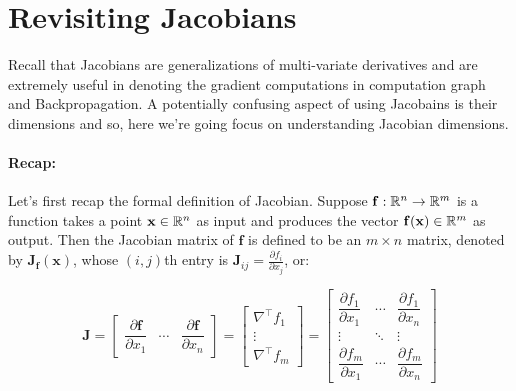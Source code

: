    






\section{Revisiting Jacobians}
Recall that Jacobians are generalizations of multi-variate derivatives and are extremely useful in denoting the gradient computations in computation graph and Backpropagation.
A potentially confusing aspect of using Jacobains is their dimensions and so, here we're going focus on understanding Jacobian dimensions. 


\noindent
\paragraph{Recap:}Let's first recap the formal definition of Jacobian. 
Suppose $\mathbf{f}: \mathbb{R}^n \rightarrow \mathbb{R}^m $ is a function takes a point $\mathbf{x} \in \mathbb{R}^n$  as input and produces the vector $\mathbf{f(x)} \in \mathbb{R}^m$ as output. 
Then the Jacobian matrix of  $\mathbf{f}$ is defined to be an $m \times n$ matrix, denoted by $\mathbf{J}_\mathbf{f}(\mathbf{x})$, whose $(i, j)$th entry is $\mathbf{J}_{ij} = \frac{\partial f_i}{\partial x_j}$, or: 

$$
\mathbf J = \begin{bmatrix}
  \dfrac{\partial \mathbf{f}}{\partial x_1} & \cdots & \dfrac{\partial \mathbf{f}}{\partial x_n}
\end{bmatrix}
= \begin{bmatrix}
  \nabla^{\top} f_1 \\  
  \vdots \\
  \nabla^{\top} f_m   
\end{bmatrix}
= \begin{bmatrix}
    \dfrac{\partial f_1}{\partial x_1} & \cdots & \dfrac{\partial f_1}{\partial x_n}\\
    \vdots                             & \ddots & \vdots\\
    \dfrac{\partial f_m}{\partial x_1} & \cdots & \dfrac{\partial f_m}{\partial x_n}
\end{bmatrix}
$$


\noindent
